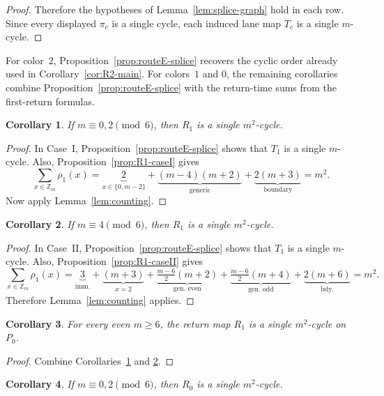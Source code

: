 \documentclass[11pt]{article}
\newtheorem{corollary}{Corollary}
\newcommand{\Zm}{\mathbb Z_m}
\begin{document}
\begin{proof}
Therefore the hypotheses of Lemma~\ref{lem:splice-graph} hold in each row.
Since every displayed $\pi_c$ is a single cycle, each induced lane map $T_c$ is a single $m$-cycle.
\end{proof}

For color~$2$, Proposition~\ref{prop:routeE-splice} recovers the cyclic order already used in Corollary~\ref{cor:R2-main}.
For colors~$1$ and $0$, the remaining corollaries combine Proposition~\ref{prop:routeE-splice} with the return-time sums from the first-return formulas.

\begin{corollary}\label{cor:R1-caseI}
If $m\equiv 0,2\pmod 6$, then $R_1$ is a single $m^2$-cycle.
\end{corollary}

\begin{proof}
In Case~I, Proposition~\ref{prop:routeE-splice} shows that $T_1$ is a single $m$-cycle.
Also, Proposition~\ref{prop:R1-caseI} gives
\[
\sum_{x\in \Zm}\rho_1(x)=\underbrace{2}_{x\in\{0,m{-}2\}}+\underbrace{(m-4)(m+2)}_{\text{generic}}+\underbrace{2(m+3)}_{\text{boundary}}=m^2.
\]
Now apply Lemma~\ref{lem:counting}.
\end{proof}

\begin{corollary}\label{cor:R1-caseII}
If $m\equiv 4\pmod 6$, then $R_1$ is a single $m^2$-cycle.
\end{corollary}

\begin{proof}
In Case~II, Proposition~\ref{prop:routeE-splice} shows that $T_1$ is a single $m$-cycle.
Also, Proposition~\ref{prop:R1-caseII} gives
\[
\sum_{x\in \Zm}\rho_1(x)
=
\underbrace{3}_{\text{imm.}}+\underbrace{(m+3)}_{x=2}+\underbrace{\tfrac{m-6}{2}(m+2)}_{\text{gen.\ even}}+\underbrace{\tfrac{m-6}{2}(m+4)}_{\text{gen.\ odd}}+\underbrace{2(m+6)}_{\text{bdy.}}=m^2.
\]
Therefore Lemma~\ref{lem:counting} applies.
\end{proof}

\begin{corollary}\label{cor:R1-all}
For every even $m\ge 6$, the return map $R_1$ is a single $m^2$-cycle on $P_0$.
\end{corollary}

\begin{proof}
Combine Corollaries~\ref{cor:R1-caseI} and \ref{cor:R1-caseII}.
\end{proof}

\begin{corollary}\label{cor:R0-caseI}
If $m\equiv 0,2\pmod 6$, then $R_0$ is a single $m^2$-cycle.
\end{corollary}
\end{document}
